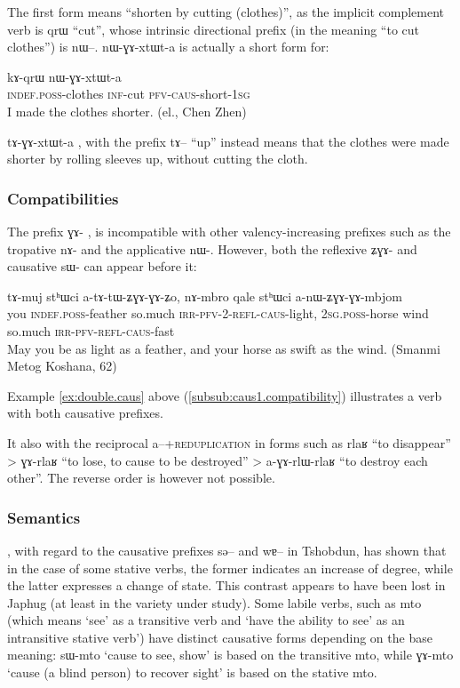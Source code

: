 \documentclass[oldfontcommands,oneside,a4paper,11pt]{article}
\newcommand{\ipa}[1]{{\phon \mbox{#1}}} %
\newcommand{\sg}{\textsc{sg}}
\newcommand{\pfv}{\textsc{pfv}}
\newcommand{\caus}{\textsc{caus}}
\newcommand{\inftv}{\textsc{inf}}
\newcommand{\irr}{\textsc{irr}}
\newcommand{\poss}{\textsc{poss}}
\newcommand{\refl}{\textsc{refl}}
\begin{document}
 The first form means ``shorten by cutting (clothes)'', as the implicit complement verb is \ipa{qrɯ} ``cut'', whose intrinsic directional prefix (in the meaning ``to cut clothes'') is \ipa{nɯ}--.  \ipa{nɯ-ɣɤ-xtɯt-a} is actually a short form for:
 
   \begin{exe}
\ex 
 \gll  	\ipa{tɯ-ŋga} \ipa{kɤ-qrɯ} \ipa{nɯ-ɣɤ-xtɯt-a}  	   \\
 \textsc{indef.poss}-clothes \inftv{}-cut \pfv{}-\caus{}-short-1\sg      \\
 \glt    I made the clothes shorter. (el., Chen Zhen)
   \end{exe}
 \ipa{tɤ-ɣɤ-xtɯt-a} , with the prefix \ipa{tɤ}-- ``up'' instead means that the clothes were made shorter by rolling sleeves up, without cutting the cloth.
 
 
\subsubsection{Compatibilities} \label{subsub:caus2:compat}
The prefix \ipa{ɣɤ-} , is incompatible with other valency-increasing prefixes such as the tropative  \ipa{nɤ-} and the applicative  \ipa{nɯ-}. However, both the reflexive  \ipa{ʑɣɤ-}   and causative  \ipa{sɯ-} can appear before it:
 \begin{exe}
\ex 
\gll \ipa{nɤʑo}  	\ipa{tɤ-muj}  	\ipa{stʰɯci}  	\ipa{a-tɤ-tɯ-ʑɣɤ-ɣɤ-ʑo,}  	\ipa{nɤ-mbro}  	\ipa{qale}  	\ipa{stʰɯci}  	\ipa{a-nɯ-ʑɣɤ-ɣɤ-mbjom}  	  \\
you  \textsc{indef.poss}-feather  so.much \irr{}-\pfv{}-2-\refl-\caus{}-light, 2\sg{}.\poss{}-horse wind so.much \irr{}-\pfv{}-\refl-\caus{}-fast \\
 \glt   May you be as light as a feather, and your horse as swift as the wind. (Smanmi Metog Koshana, 62)
   \end{exe}
Example  \ref{ex:double.caus} above (\ref{subsub:caus1.compatibility}) illustrates a verb with both causative prefixes.



It also with the reciprocal \ipa{a}--+\textsc{reduplication} in forms such as \ipa{rlaʁ}    ``to disappear'' > \ipa{ɣɤ-rlaʁ} ``to lose, to cause to be destroyed'' > \ipa{a-ɣɤ-rlɯ-rlaʁ} ``to destroy each other''. The reverse order is however not possible.
 

\subsubsection{Semantics} \label{subsub:caus-g:semantics}
\citet{jackson06paisheng, jackson14morpho}, with regard to the causative prefixes \ipa{sə}-- and \ipa{wɐ}-- in Tshobdun, has shown that in the case of some stative verbs, the former indicates an increase of degree, while the latter expresses a change of state. This contrast appears to have been lost in Japhug (at least in the variety under study).
Some labile verbs, such as \ipa{mto} (which means `see' as a transitive verb and `have the ability to see' as an intransitive stative verb') have distinct causative forms depending on the base meaning: \ipa{sɯ-mto} `cause to see, show' is based on the transitive \ipa{mto}, while \ipa{ɣɤ-mto} `cause (a blind person) to recover sight' is based on the stative \ipa{mto}.
\end{document}

